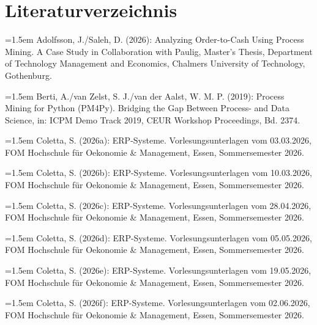 \section*{Literaturverzeichnis}

\begingroup\setlength{\parindent}{0pt}\setlength{\parskip}{0.5em}

\noindent\hangindent=1.5em Adolfsson, J./Saleh, D. (2026): Analyzing Order-to-Cash Using Process Mining. A Case Study in Collaboration with Paulig, Master's Thesis, Department of Technology Management and Economics, Chalmers University of Technology, Gothenburg.\par

\noindent\hangindent=1.5em Berti, A./van Zelst, S. J./van der Aalst, W. M. P. (2019): Process Mining for Python (PM4Py). Bridging the Gap Between Process- and Data Science, in: ICPM Demo Track 2019, CEUR Workshop Proceedings, Bd. 2374.\par

\noindent\hangindent=1.5em Coletta, S. (2026a): ERP-Systeme. Vorlesungsunterlagen vom 03.03.2026, FOM Hochschule für Oekonomie \& Management, Essen, Sommersemester 2026.\par

\noindent\hangindent=1.5em Coletta, S. (2026b): ERP-Systeme. Vorlesungsunterlagen vom 10.03.2026, FOM Hochschule für Oekonomie \& Management, Essen, Sommersemester 2026.\par

\noindent\hangindent=1.5em Coletta, S. (2026c): ERP-Systeme. Vorlesungsunterlagen vom 28.04.2026, FOM Hochschule für Oekonomie \& Management, Essen, Sommersemester 2026.\par

\noindent\hangindent=1.5em Coletta, S. (2026d): ERP-Systeme. Vorlesungsunterlagen vom 05.05.2026, FOM Hochschule für Oekonomie \& Management, Essen, Sommersemester 2026.\par

\noindent\hangindent=1.5em Coletta, S. (2026e): ERP-Systeme. Vorlesungsunterlagen vom 19.05.2026, FOM Hochschule für Oekonomie \& Management, Essen, Sommersemester 2026.\par

\noindent\hangindent=1.5em Coletta, S. (2026f): ERP-Systeme. Vorlesungsunterlagen vom 02.06.2026, FOM Hochschule für Oekonomie \& Management, Essen, Sommersemester 2026.\par

